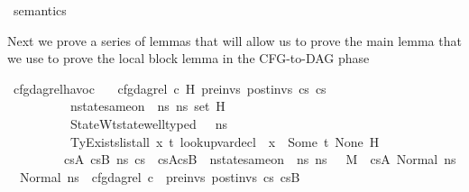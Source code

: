\begin{isabellebody}
\isanewline
\isanewline
{}\isamarkupfalse%
\ semantics\ %
\begin{isamarkuptext}%
Next we prove a series of lemmas that will allow us to prove the main lemma that we use to
prove the local block lemma in the CFG-to-DAG phase%
\end{isamarkuptext}\isamarkuptrue%
\isamarkupfalse%
\ cfg{\isacharunderscore}{\kern0pt}dag{\isacharunderscore}{\kern0pt}rel{\isacharunderscore}{\kern0pt}havoc{\isacharcolon}{\kern0pt}\isanewline
\ \ \ {\isachardoublequoteopen}cfg{\isacharunderscore}{\kern0pt}dag{\isacharunderscore}{\kern0pt}rel\ c\ H\ pre{\isacharunderscore}{\kern0pt}invs\ post{\isacharunderscore}{\kern0pt}invs\ cs{}\ cs{}{\isachardoublequoteclose}\ \isanewline
\ \ \ \ \ \ \ \ \ \ {\isachardoublequoteopen}nstate{\isacharunderscore}{\kern0pt}same{\isacharunderscore}{\kern0pt}on\ {\isasymLambda}\ ns{}\ ns{}\ {\isacharparenleft}{\kern0pt}set\ H{\isacharparenright}{\kern0pt}{\isachardoublequoteclose}\ \isanewline
\ \ \ \ \ \ \ \ \ \ StateWt{\isacharcolon}{\kern0pt}{\isachardoublequoteopen}state{\isacharunderscore}{\kern0pt}well{\isacharunderscore}{\kern0pt}typed\ {\isasymLambda}\ {\isasymOmega}\ ns{}{\isachardoublequoteclose}\ \isanewline
\ \ \ \ \ \ \ \ \ \ TyExists{\isacharcolon}{\kern0pt}{\isachardoublequoteopen}list{\isacharunderscore}{\kern0pt}all\ {\isacharparenleft}{\kern0pt}{\isasymlambda}x{\isachardot}{\kern0pt}\ {\isasymexists}t{\isachardot}{\kern0pt}\ lookup{\isacharunderscore}{\kern0pt}var{\isacharunderscore}{\kern0pt}decl\ {\isasymLambda}\ x\ {\isacharequal}{\kern0pt}\ Some\ {\isacharparenleft}{\kern0pt}t{\isacharcomma}{\kern0pt}\ None{\isacharparenright}{\kern0pt}{\isacharparenright}{\kern0pt}\ H{\isachardoublequoteclose}\isanewline
\ \ \ \ \ \ \ \ \ {\isachardoublequoteopen}{\isacharparenleft}{\kern0pt}{\isasymexists}cs{}A\ cs{}B\ ns{}{\isacharprime}{\kern0pt}{\isachardot}{\kern0pt}\ cs{}\ {\isacharequal}{\kern0pt}\ cs{}A{\isacharat}{\kern0pt}cs{}B\ {\isasymand}\ nstate{\isacharunderscore}{\kern0pt}same{\isacharunderscore}{\kern0pt}on\ {\isasymLambda}\ ns{}\ ns{}{\isacharprime}{\kern0pt}\ {\isacharbraceleft}{\kern0pt}{\isacharbraceright}{\kern0pt}\ {\isasymand}\ {\isacharparenleft}{\kern0pt}M{\isacharcomma}{\kern0pt}{\isasymLambda}{\isacharcomma}{\kern0pt}{\isasymGamma}{\isacharcomma}{\kern0pt}{\isasymOmega}\ {\isasymturnstile}\ {\isasymlangle}cs{}A{\isacharcomma}{\kern0pt}\ Normal\ ns{}{\isasymrangle}\ {\isacharbrackleft}{\kern0pt}{\isasymrightarrow}{\isacharbrackright}{\kern0pt}\ Normal\ ns{}{\isacharprime}{\kern0pt}{\isacharparenright}{\kern0pt}\ {\isasymand}\ cfg{\isacharunderscore}{\kern0pt}dag{\isacharunderscore}{\kern0pt}rel\ c\ {\isacharbrackleft}{\kern0pt}{\isacharbrackright}{\kern0pt}\ pre{\isacharunderscore}{\kern0pt}invs\ post{\isacharunderscore}{\kern0pt}invs\ cs{}\ cs{}B{\isacharparenright}{\kern0pt}{\isachardoublequoteclose}\isanewline

\end{isabellebody}
